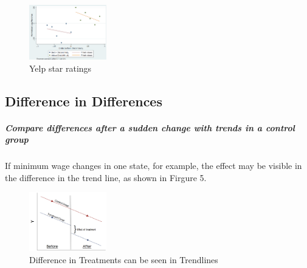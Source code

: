 \begin{figure}[ht]
  \begin{center}
    \includegraphics[width=0.3\textwidth]{figures/f4}
        \caption{ Yelp star ratings}
    \label{figure 4}
  \end{center}
\end{figure}

\subsection{Difference in Differences}
\subparagraph{Compare differences after a sudden change with trends in a control group} If minimum wage changes in one state, for example, the effect may be visible in the difference in the trend line, as shown in Firgure 5.

\begin{figure}[ht]
  \begin{center}
    \includegraphics[width=0.3\textwidth]{figures/f5}
        \caption{Difference in Treatments can be seen in Trendlines}
    \label{figure 5}
  \end{center}
\end{figure}


